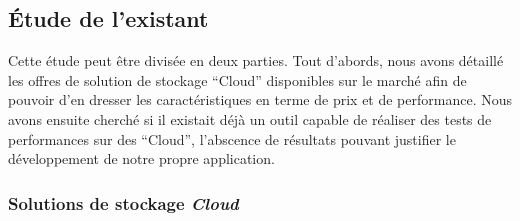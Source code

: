 \documentclass[10pt]{article}
\begin{document}
\subsection{Étude de l'existant}

Cette étude peut être divisée en deux parties. Tout d’abords, nous avons
détaillé les offres de solution de stockage “Cloud” disponibles sur le marché
afin de pouvoir d'en dresser les caractéristiques en terme de prix et de
performance.  Nous avons ensuite cherché si il existait déjà un outil capable
de réaliser des tests de performances sur des “Cloud”, l'abscence de résultats
pouvant justifier le développement de notre
propre application.

\newpage

\subsubsection{Solutions de stockage \textit{Cloud}}
\end{document}
